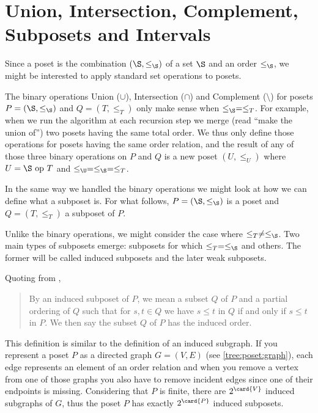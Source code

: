 \section{Union, Intersection, Complement, Subposets and Intervals}
\label{tree:poset:sub}


Since a poset is the combination $(\S, \le_{\S})$ of a set $\S$ and an order
$\le_{\S}$, we might be interested to apply standard set operations to posets.

The binary operations Union ($\cup$), Intersection ($\cap$) and Complement
($\setminus$) for posets $P = (\S, \le_{\S})$ and $Q = (T, \le_T)$ only make sense
when $\le_{\S} = \le_T$. For example, when we run the algorithm \mergesort at each
recursion step we merge (read ``make the union of'') two posets having the same
total order. We thus only define those operations for posets having the same
order relation, and the result of any of those three binary operations on $P$
and $Q$ is a new poset $(U, \le_U)$ where $U = \S~\text{op}~T$ and $\le_{\U} =
\le_{\S} = \le_T$.


In the same way we handled the binary operations we might look at how we can
define what a subposet is. For what follows, $P = (\S, \le_{\S})$ is a poset and $Q
= (T, \le_T)$ a subposet of $P$.

Unlike the binary operations, we might consider the case where $\le_T \neq
\le_{\S}$. Two main types of subposets emerge: subposets for which $\le_T =
\le_{\S}$ and others. The former will be called induced subposets and the later
weak subposets.

Quoting from \citet*{Stanley:2011:ECV:2124415},

\begin{quotation}

By an induced subposet of $P$, we mean a subset $Q$ of $P$ and a partial
ordering of $Q$ such that for $s, t \in Q$ we have $s \leq t$ in $Q$ if and
only if $s \leq t$ in $P$. We then say the subset $Q$ of $P$ has the induced
order.

\end{quotation}

This definition is similar to the definition of an induced subgraph. If you
represent a poset $P$ as a directed graph $G = (V, E)$ (see
\ref{tree:poset:graph}), each edge represents an element of an order relation
and when you remove a vertex from one of those graphs you also have to remove
incident edges since one of their endpoints is missing. Considering that $P$ is
finite, there are $2^{\card{V}}$ induced subgraphs of $G$, thus the poset $P$ has
exactly $2^{\card{P}}$ induced subposets.


